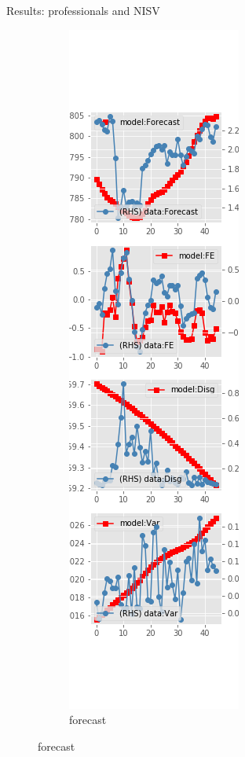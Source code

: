 \documentclass{beamer}
\begin{document}
\begin{frame}{Results: professionals and NISV}
	\begin{figure}[ht]
		\label{NISV_diag_SPF}
		\begin{subfigure}[b]{0.19\textwidth}
			\centering
			\caption{forecast}
			\includegraphics[width=\textwidth, height = 0.8\textheight]{figuresDraft/spf_ni_est_sv_diag0.png}

\end{subfigure}
\end{figure}
\end{frame}
\end{document}
